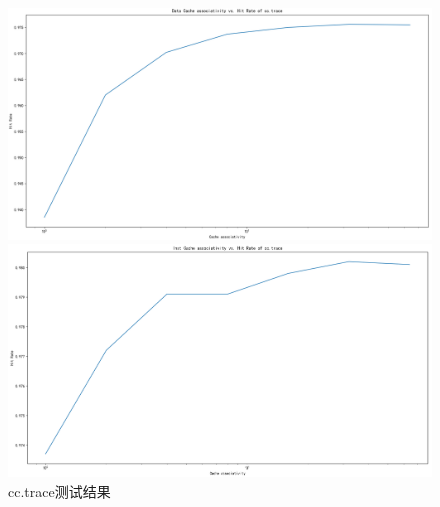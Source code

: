 \documentclass[12pt,hyperref,a4paper,UTF8]{ctexart}
\begin{document}
\begin{figure}[H]
    \centering
    \begin{minipage}[b]{0.45\textwidth}
        \centering
        \includegraphics[width=\textwidth]{./figures/fig/image29.png}
    \end{minipage}
    \hfill
    \begin{minipage}[b]{0.45\textwidth}
        \centering
        \includegraphics[width=\textwidth]{./figures/fig/image30.png}
    \end{minipage}
    \caption{cc.trace测试结果}
\end{figure}
\end{document}

